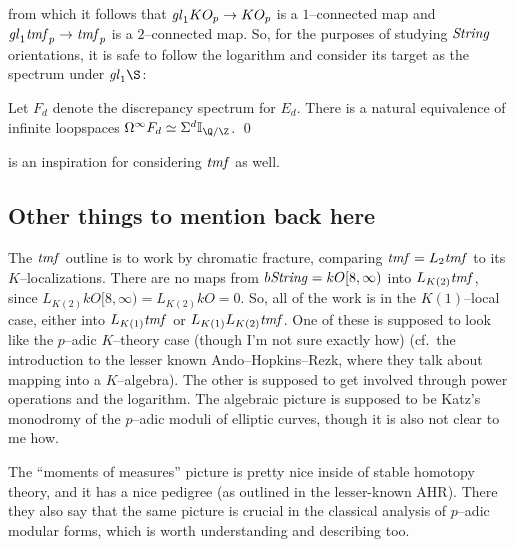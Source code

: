 \noindent from which it follows that $\mathit{gl}_1 KO_p \to KO_p$ is a $1$--connected map and $\mathit{gl}_1 \mathit{tmf}_p \to \mathit{tmf}_p$ is a $2$--connected map.  So, for the purposes of studying $\mathit{String}$ orientations, it is safe to follow the logarithm and consider its target as the spectrum under $\gl_1 \S$:













\begin{theorem}
Let $F_d$ denote the discrepancy spectrum for $E_d$.  There is a natural equivalence of infinite loopspaces $\Loops^\infty F_d \simeq \Susp^d \mathbb I_{\Q/\Z}$. \qed
\end{theorem}

 is an inspiration for considering $\mathit{tmf}$ as well.





\subsection{Other things to mention back here}




The $\mathit{tmf}$ outline is to work by chromatic fracture, comparing $\mathit{tmf} = L_2 \mathit{tmf}$ to its $K$--localizations.  There are no maps from $b\mathit{String} = kO[8, \infty)$ into $L_{K(2)} \mathit{tmf}$, since $L_{K(2)} kO[8, \infty) = L_{K(2)} kO = 0$.  So, all of the work is in the $K(1)$--local case, either into $L_{K(1)} \mathit{tmf}$ or $L_{K(1)} L_{K(2)} \mathit{tmf}$.  One of these is supposed to look like the $p$--adic $K$--theory case (though I'm not sure exactly how) (cf.\ the introduction to the lesser known Ando--Hopkins--Rezk, where they talk about mapping into a $K$--algebra).  The other is supposed to get involved through power operations and the logarithm.  The algebraic picture is supposed to be Katz's monodromy of the $p$--adic moduli of elliptic curves, though it is also not clear to me how.



The ``moments of measures'' picture is pretty nice inside of stable homotopy theory, and it has a nice pedigree (as outlined in the lesser-known AHR).  There they also say that the same picture is crucial in the classical analysis of $p$--adic modular forms, which is worth understanding and describing too.



